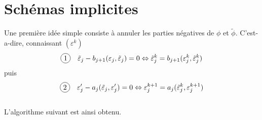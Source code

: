 \section{Schémas implicites}
Une première idée simple consiste à annuler les parties négatives de $\phi$ et $\tilde{\phi}$. C'est-a-dire, connaissant $(\varepsilon^k)$
\begin{equation*}
\circled{1} \quad \tilde{\varepsilon}_j - b_{j+1}(\varepsilon_j,\tilde{\varepsilon}_j) = 0
\Leftrightarrow \tilde{\varepsilon}_j^k = b_{j+1}(\varepsilon_j^k,\tilde{\varepsilon}_j^k)
\end{equation*}
puis
\begin{equation*}
\circled{2} \quad \varepsilon'_j - a_j(\tilde{\varepsilon}_j,\varepsilon'_j) = 0 \Leftrightarrow \varepsilon_j^{k+1} = a_j(\tilde{\varepsilon}_j^k,\varepsilon_j^{k+1})
\end{equation*}
\\L'algorithme suivant est ainsi obtenu.
